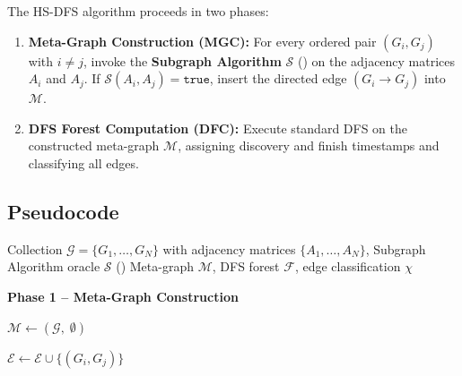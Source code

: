 ﻿\documentclass[12pt,a4paper]{article}
\theoremstyle{plain}
\theoremstyle{definition}
\theoremstyle{remark}
\begin{document}
	The HS-DFS algorithm proceeds in two phases:
	
	\begin{enumerate}
		\item \textbf{Meta-Graph Construction (MGC):} For every ordered pair
		$(G_i, G_j)$ with $i \neq j$, invoke the \textbf{Subgraph Algorithm}
		$\mathcal{S}$ () on the adjacency matrices $A_i$ and
		$A_j$.  If $\mathcal{S}(A_i, A_j) = \mathtt{true}$, insert the directed
		edge $(G_i \to G_j)$ into $\mathcal{M}$.
		\item \textbf{DFS Forest Computation (DFC):} Execute standard DFS on the
		constructed meta-graph $\mathcal{M}$, assigning discovery and finish
		timestamps and classifying all edges.
	\end{enumerate}
	
	\subsection{Pseudocode}
	
	\begin{algorithm}[H]
		\caption{HS-DFS: Hierarchical Subgraph Depth-First Search}
		\label{alg:hsdfs}
		\begin{algorithmic}[1]
			\Require Collection $\mathcal{G} = \{G_1, \ldots, G_N\}$ with adjacency
			matrices $\{A_1, \ldots, A_N\}$,
			Subgraph Algorithm oracle $\mathcal{S}$ ()
			\Ensure  Meta-graph $\mathcal{M}$, DFS forest $\mathcal{F}$,
			edge classification $\chi$
			
			\Statex \hrulefill
			\Statex \textbf{Phase 1 -- Meta-Graph Construction}
			\Statex \hrulefill
			
			\State $\mathcal{M} \leftarrow (\mathcal{G},\; \emptyset)$
			
			\State $\mathcal{E} \leftarrow \mathcal{E} \cup \{(G_i, G_j)\}$
			\EndIf
			\EndIf
			\EndFor
			\EndFor
		\end{algorithmic}
	\end{algorithm}

	\newpage
\end{document}
